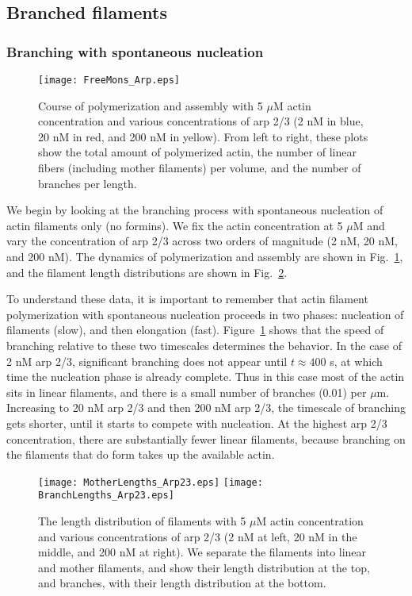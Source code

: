 \documentclass[11pt]{article}
\begin{document}
\subsection{Branched filaments \label{sec:BF}}

\subsubsection{Branching with spontaneous nucleation \label{sec:BrSN}}

\begin{figure}
\centering
\texttt{[image: FreeMons\_Arp.eps]}
\caption{\label{fig:PolyDynamicsArp}Course of polymerization and assembly with 5 $\mu$M actin concentration and various concentrations of arp 2/3 (2 nM in blue, 20 nM in red, and 200 nM in yellow). From left to right, these plots show the total amount of polymerized actin, the number of linear fibers (including mother filaments) per volume, and the number of branches per length. }
\end{figure}

We begin by looking at the branching process with spontaneous nucleation of actin filaments only (no formins). We fix the actin concentration at 5 $\mu$M and vary the concentration of arp 2/3 across two orders of magnitude (2 nM, 20 nM, and 200 nM). The dynamics of polymerization and assembly are shown in Fig.\ \ref{fig:PolyDynamicsArp}, and the filament length distributions are shown in Fig.\ \ref{fig:LengthDistsArp}. 

To understand these data, it is important to remember that actin filament polymerization with spontaneous nucleation proceeds in two phases: nucleation of filaments (slow), and then elongation (fast). Figure\ \ref{fig:PolyDynamicsArp} shows that the speed of branching relative to these two timescales determines the behavior. In the case of 2 nM arp 2/3, significant branching does not appear until $t \approx 400$ s, at which time the nucleation phase is already complete. Thus in this case most of the actin sits in linear filaments, and there is a small number of branches (0.01) per $\mu$m. Increasing to 20 nM arp 2/3 and then 200 nM arp 2/3, the timescale of branching gets shorter, until it starts to compete with nucleation. At the highest arp 2/3 concentration, there are substantially fewer linear filaments, because branching on the filaments that do form takes up the available actin.


\begin{figure}
\centering
\texttt{[image: MotherLengths\_Arp23.eps]}
\texttt{[image: BranchLengths\_Arp23.eps]}
\caption{\label{fig:LengthDistsArp} The length distribution of filaments with 5 $\mu$M actin concentration and various concentrations of arp 2/3 (2 nM at left, 20 nM in the middle, and 200 nM at right). We separate the filaments into linear and mother filaments, and show their length distribution at the top, and branches, with their length distribution at the bottom. }
\end{figure}
\end{document}
